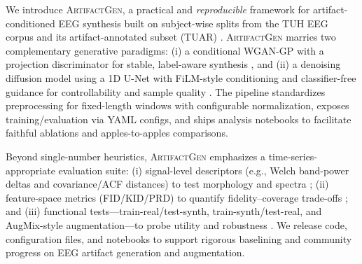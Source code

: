 \documentclass{article}
\begin{document}
We introduce \textsc{ArtifactGen}, a practical and \emph{reproducible} framework for artifact-conditioned EEG synthesis built on subject-wise splits from the TUH EEG corpus and its artifact-annotated subset (TUAR) \citep{obeid2016tuh,hamid2020tuar}. \textsc{ArtifactGen} marries two complementary generative paradigms: (i) a conditional WGAN-GP with a projection discriminator for stable, label-aware synthesis \citep{gulrajani2017wgan,miyato2018cgan}, and (ii) a denoising diffusion model using a 1D U-Net with FiLM-style conditioning \citep{perez2018filmvisual} and classifier-free guidance for controllability and sample quality \citep{ho2020denoisingprobabilistic,ho2022classifierfree}. The pipeline standardizes preprocessing for fixed-length windows with configurable normalization, exposes training/evaluation via YAML configs, and ships analysis notebooks to facilitate faithful ablations and apples-to-apples comparisons.

Beyond single-number heuristics, \textsc{ArtifactGen} emphasizes a time-series-appropriate evaluation suite: (i) signal-level descriptors (e.g., Welch band-power deltas and covariance/ACF distances) to test morphology and spectra \citep{welch1967usefast}; (ii) feature-space metrics (FID/KID/PRD) to quantify fidelity–coverage trade-offs \citep{heusel2017ganstrained,binkowski2018demystifyingmmd,sajjadi2018assessingprecision}; and (iii) functional tests—train-real/test-synth, train-synth/test-real, and AugMix-style augmentation—to probe utility and robustness \citep{hendrycks2020augmixsimple}. We release code, configuration files, and notebooks to support rigorous baselining and community progress on EEG artifact generation and augmentation.
\end{document}

